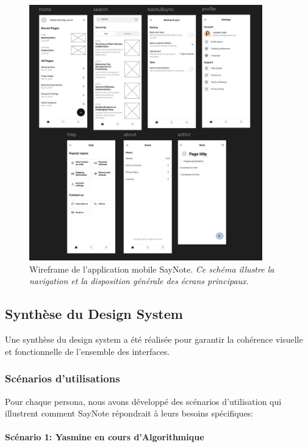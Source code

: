    \begin{figure}[H]
        \centering
        \includegraphics[width=0.9\textwidth]{assets/docs/mobile/wireframe_app-2.jpg}
        \caption{Wireframe de l'application mobile SayNote. \newline\textit{Ce schéma illustre la navigation et la disposition générale des écrans principaux.}}
        \label{fig:wireframe_app_main}
    \end{figure}
    
    
    \subsection{Synthèse du Design System}
    
    Une synthèse du design system a été réalisée pour garantir la cohérence visuelle et fonctionnelle de l'ensemble des interfaces.
    
        
    \subsubsection{Scénarios d'utilisations}
    
    Pour chaque persona, nous avons développé des scénarios d'utilisation qui illustrent comment SayNote répondrait à leurs besoins spécifiques:
    
    \paragraph{Scénario 1: Yasmine en cours d'Algorithmique}
    
